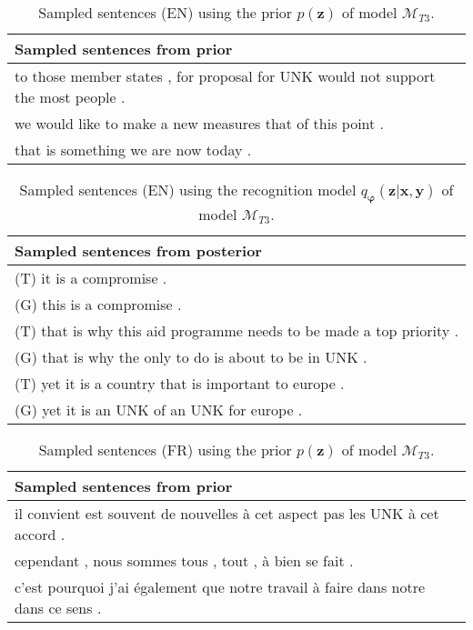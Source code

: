 \begin{table}
  \centering
  \begin{tabular}{|L{14cm}|} 
    \hline
    Sampled sentences from prior\\
    \hline\hline
    to those member states , for proposal for UNK would not support the most people .\\
    \hline
    we would like to make a new measures that of this point .\\
    \hline
    that is something we are now today .\\
    \hline
  \end{tabular}
  \caption{Sampled sentences (EN) using the prior $p(\bm{z})$ of model $\mathcal{M}_{T3}$.}
\end{table}

\begin{table}
  \centering
  \begin{tabular}{|L{14cm}|} 
    \hline
    Sampled sentences from posterior\\ [0.5ex] 
    \hline\hline
    (T) it is a compromise .\\
    (G) this is a compromise .\\
    \hline
    (T) that is why this aid programme needs to be made a top priority .\\
    (G) that is why the only to do is about to be in UNK .\\
    \hline
    (T) yet it is a country that is important to europe .\\
    (G) yet it is an UNK of an UNK for europe .\\
    \hline
  \end{tabular}
  \caption{Sampled sentences (EN) using the recognition model
    $q_{\bm{\varphi}}(\bm{z} | \bm{x}, \bm{y})$ of model $\mathcal{M}_{T3}$.}
\end{table}

\begin{table}
  \centering
  \begin{tabular}{|L{14cm}|} 
    \hline
    Sampled sentences from prior\\
    \hline\hline
    il convient est souvent de nouvelles à cet aspect pas les UNK à cet accord .\\
    \hline
    cependant , nous sommes tous , tout , à bien se fait .\\
    \hline
    c'est pourquoi j'ai également que notre travail à faire dans notre dans ce sens .\\
    \hline
  \end{tabular}
  \caption{Sampled sentences (FR) using the prior $p(\bm{z})$ of model $\mathcal{M}_{T3}$.}
\end{table}

